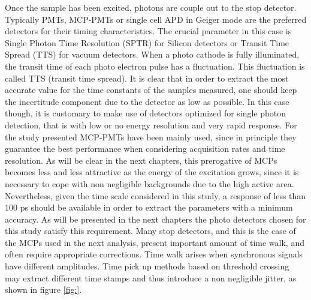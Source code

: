 Once the sample has been excited, photons are couple out to the stop detector. Typically PMTs, MCP-PMTs or single cell APD in Geiger mode are the preferred detectors for their timing characteristics. The crucial parameter in this case is Single Photon Time Resolution (SPTR) for Silicon detectors or Transit Time Spread (TTS) for vacuum detectors.
When a photo cathode is fully illuminated, the transit time of each photo electron pulse has a fluctuation. This fluctuation is called TTS (transit time spread).
It is clear that in order to extract the most accurate value for the time constants of the samples measured, one should keep the incertitude component due to the detector as low as possible. In this case though, it is customary to make use of detectors optimized for single photon detection, that is with low or no energy resolution and very rapid response.
For the study presented MCP-PMTs have been mainly used, since in principle they guarantee the best performance when considering acquisition rates and time resolution.
As will be clear in the next chapters, this prerogative of MCPs becomes less and less attractive as the energy of the excitation grows, since it is necessary to cope with non negligible backgrounds due to the high active area.
Nevertheless, given the time scale considered in this study, a response of less than 100 ps should be available in order to extract the parameters with a minimum accuracy. As will be presented in the next chapters the photo detectors chosen for this study satisfy this requirement.
Many stop detectors, and this is the case of the MCPs used in the next analysis, present important amount of time walk, and often require appropriate corrections.
Time walk arises when synchronous signals have different amplitudes. Time pick up methods based on threshold crossing may extract different time stamps and thus introduce a non negligible jitter, as shown in figure \ref{fig:}.

